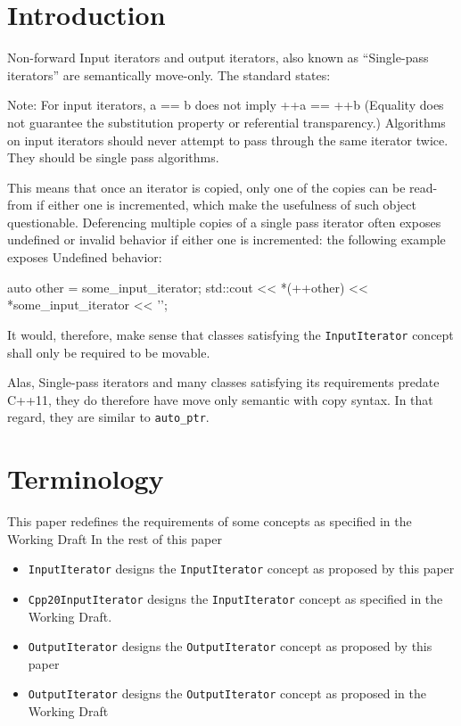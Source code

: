 \documentclass{wg21}
\begin{document}
\hypertarget{introduction}{%
	\section{Introduction}\label{introduction}}

Non-forward Input iterators and output iterators, also known as
``Single-pass iterators'' are semantically move-only. The standard
states:

Note: For input iterators, a == b does not imply ++a == ++b (Equality
does not guarantee the substitution property or referential
transparency.) Algorithms on input iterators should never attempt to
pass through the same iterator twice. They should be single pass
algorithms.

This means that once an iterator is copied, only one of the copies can
be read-from if either one is incremented, which make the usefulness of
such object questionable. Deferencing multiple copies of a single pass
iterator often exposes undefined or invalid behavior if either one is
incremented: the following example exposes Undefined behavior: 
\begin{codeblock}

auto other = some_input_iterator;
std::cout << *(++other) << *some_input_iterator << '\n';
\end{codeblock}

It would, therefore, make sense that classes satisfying the
\texttt{InputIterator} concept shall only be required to be movable.

Alas, Single-pass iterators and many classes satisfying its requirements
predate C++11, they do therefore have move only semantic with copy
syntax. In that regard, they are similar to \texttt{auto\_ptr}.

\hypertarget{terminology}{%
	\section{Terminology}\label{terminology}}

This paper redefines the requirements of some concepts as specified in
the Working Draft In the rest of this paper

\begin{itemize}
	\item
	\texttt{InputIterator} designs the \texttt{InputIterator} concept as
	proposed by this paper
	\item
	\texttt{Cpp20InputIterator} designs the \texttt{InputIterator} concept
	as specified in the Working Draft.
	\item
	\texttt{OutputIterator} designs the \texttt{OutputIterator} concept as
	proposed by this paper
	\item
	\texttt{OutputIterator} designs the \texttt{OutputIterator} concept as
	proposed in the Working Draft
\end{itemize}
\end{document}
